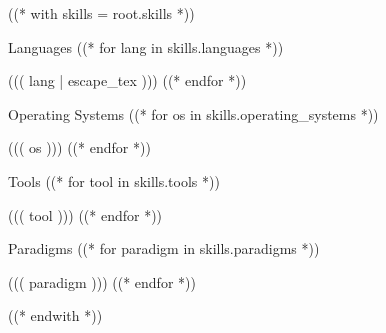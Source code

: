 ((* with skills = root.skills *))
\relax
    \vspace{-2em} %
    \begin{multicols}{2}
        \begin{csitemize}{Languages}
        ((* for lang in skills.languages *))
            \item ((( lang | escape_tex )))
        ((* endfor *))
        \end{csitemize}

        \begin{csitemize}{Operating Systems}
        ((* for os in skills.operating_systems *))
            \item ((( os )))
        ((* endfor *))
        \end{csitemize}

        \begin{csitemize}{Tools}
        ((* for tool in skills.tools *))
            \item ((( tool )))
        ((* endfor *))
        \end{csitemize}

        \begin{csitemize}{Paradigms}
        ((* for paradigm in skills.paradigms *))
            \item ((( paradigm )))
        ((* endfor *))
        \end{csitemize}
    \end{multicols}
((* endwith *))
